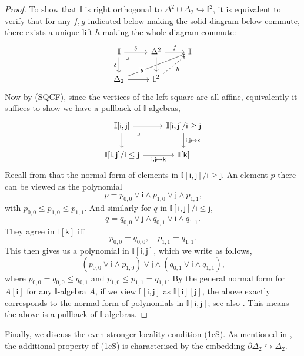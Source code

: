 \documentclass[a4paper,12pt]{amsart}
\theoremstyle{definition}
\newcommand{\mbb}[1]{\mathbb{#1}}
\newcommand{\I}{\mbb I}
\newcommand{\ms}[1]{\mathsf{#1}}
\newcommand{\hook}{\hookrightarrow}
\begin{document}
\begin{proof}
  To show that $\I$ is right orthogonal to $\Delta^2 \cup \Delta_2 \hook \I^2$, it is equivalent to verify that for any $f,g$ indicated below making the solid diagram below commute, there exists a unique lift $h$ making the whole diagram commute:
  \[\begin{tikzcd}
    \I \ar[r, "\delta"] \ar[d, "\delta"'] & \Delta^2 \ar[r, "f"] \ar[d] & \I \\
    \Delta_2 \ar[urr, "g"{description, near start}] \ar[r] & \I^2 \ar[ur, dashed, "h"']
    \arrow["\lrcorner"{anchor=center, pos=0.125}, draw=none, from=1-1, to=2-2]
  \end{tikzcd}\]
  Now by (SQCF), since the vertices of the left square are all affine, equivalently it suffices to show we have a pullback of $\I$-algebras,
  \[\begin{tikzcd}
    {\I[\ms{i},\ms{j}]} \ar[r] \ar[d] & {\I[\ms{i},\ms{j}]/\ms{i} \ge \ms{j}} \ar[d, "{\ms{i},\ms{j} \mapsto\ms{k}}"] \\
    {\I[\ms{i},\ms{j}]/\ms{i} \le \ms{j}} \ar[r, "{\ms{i},\ms{j}\mapsto\ms{k}}"'] & {\I[\ms{k}]}
    \arrow["\lrcorner"{anchor=center, pos=0.125}, draw=none, from=1-1, to=2-2]
  \end{tikzcd}\]
  Recall from  that the normal form of elements in $\I[\ms{i},\ms{j}]/\ms{i}\ge \ms{j}$. An element $p$ there can be viewed as the polynomial 
  \[ p = p_{0,0} \vee \ms{i}\wedge p_{1,0} \vee \ms{j}\wedge p_{1,1}\text{,} \]
  with $p_{0,0} \le p_{1,0} \le p_{1,1}$. And similarly for $q$ in $\I[\ms{i},\ms{j}]/\ms{i} \le \ms{j}$, 
  \[ q = q_{0,0} \vee \ms{j} \wedge q_{0,1} \vee \ms{i} \wedge q_{1,1}\text{.} \]
  They agree in $\I[\ms{k}]$ iff 
  \[ p_{0,0} = q_{0,0}, \quad p_{1,1} = q_{1,1}\text{.} \]
  This then gives us a polynomial in $\I[\ms{i},\ms{j}]$, which we write as follows,
  \[ (p_{0,0} \vee \ms{i} \wedge p_{1,0}) \vee \ms{j} \wedge (q_{0,1} \vee \ms{i} \wedge q_{1,1})\text{,} \]
  where $p_{0,0} = q_{0,0} \le q_{0,1}$ and $p_{1,0} \le p_{1,1} = q_{1,1}$. 
  By the general normal form for $A[\ms{i}]$ for any $\I$-algebra $A$, if we view $\I[\ms{i},\ms{j}]$ as $\I[\ms{i}][\ms{j}]$, the above exactly corresponds to the normal form of polynomials in $\I[\ms{i},\ms{j}]$; see also \citet[Ch.\ 1, Thm.\ 10.21]{lausch2000algebra}. This means the above is a pullback of $\I$-algebras.
\end{proof}



Finally, we discuss the even stronger locality condition (1cS). As mentioned in , the additional property of (1cS) is characterised by the embedding $\partial\Delta_2 \hook \Delta_2$.
\end{document}
